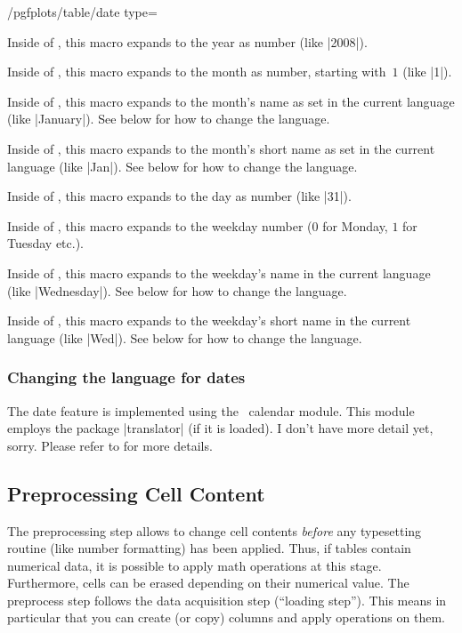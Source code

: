 \begin{stylekey}{/pgfplots/table/date type=}
\begin{command}{\year}
	Inside of , this macro expands to the year as number (like |2008|).
\end{command}
\begin{command}{\month}
	Inside of , this macro expands to the month as number, starting with~$1$ (like |1|).
\end{command}
\begin{command}{\monthname}
	Inside of , this macro expands to the month's name as set in the current language (like |January|).
	 See below for how to change the language.
\end{command}
\begin{command}{\monthshortname}
	Inside of , this macro expands to the month's short name as set in the current language (like |Jan|). 
	See below for how to change the language.
\end{command}
\begin{command}{\day}
	Inside of , this macro expands to the day as number (like |31|).
\end{command}
\begin{command}{\weekday}
	Inside of , this macro expands to the weekday number ($0$ for Monday, $1$ for Tuesday etc.).
\end{command}
\begin{command}{\weekdayname}
	Inside of , this macro expands to the weekday's name in the current language (like |Wednesday|).
	 See below for how to change the language.
\end{command}
\begin{command}{\weekdayshortname}
	Inside of , this macro expands to the weekday's short name in the current language (like |Wed|).
	 See below for how to change the language.
\end{command}

\subsubsection*{Changing the language for dates}
The date feature is implemented using the \PGF\ calendar module. This module employs the package |translator| (if it is loaded). I don't have more detail yet, sorry. Please refer to \cite{tikz} for more details.
\end{stylekey}

\subsection{Preprocessing Cell Content}
\label{sec:pgfplotstable:preproc}
The preprocessing step allows to change cell contents \emph{before} any typesetting routine (like number formatting) has been applied. Thus, if tables contain numerical data, it is possible to apply math operations at this stage. Furthermore, cells can be erased depending on their numerical value. The preprocess step follows the data acquisition step (``loading step''). This means in particular that you can create (or copy) columns and apply operations on them.

